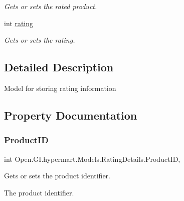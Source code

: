 \begin{DoxyCompactItemize}
\begin{DoxyCompactList}\small\item\em Gets or sets the rated product. \end{DoxyCompactList}\item 
int \hyperlink{class_open_1_1_g_i_1_1hypermart_1_1_models_1_1_rating_details_a4ebc3ade419dafcd0571436f6b6363b8}{rating}
\begin{DoxyCompactList}\small\item\em Gets or sets the rating. \end{DoxyCompactList}\end{DoxyCompactItemize}


\subsection{Detailed Description}
Model for storing rating information 



\subsection{Property Documentation}
\hypertarget{class_open_1_1_g_i_1_1hypermart_1_1_models_1_1_rating_details_a52049471fb02928fdd8f3b3d9c127a43}{}\label{class_open_1_1_g_i_1_1hypermart_1_1_models_1_1_rating_details_a52049471fb02928fdd8f3b3d9c127a43} 
\subsubsection{\texorpdfstring{Product\+ID}{ProductID}}
{\footnotesize\ttfamily int Open.\+G\+I.\+hypermart.\+Models.\+Rating\+Details.\+Product\+ID\hspace{0.3cm}{\ttfamily [get]}, {\ttfamily [set]}}



Gets or sets the product identifier. 

The product identifier. \hypertarget{class_open_1_1_g_i_1_1hypermart_1_1_models_1_1_rating_details_a56011ceff140008b151d983b78371002}{}\label{class_open_1_1_g_i_1_1hypermart_1_1_models_1_1_rating_details_a56011ceff140008b151d983b78371002} 
